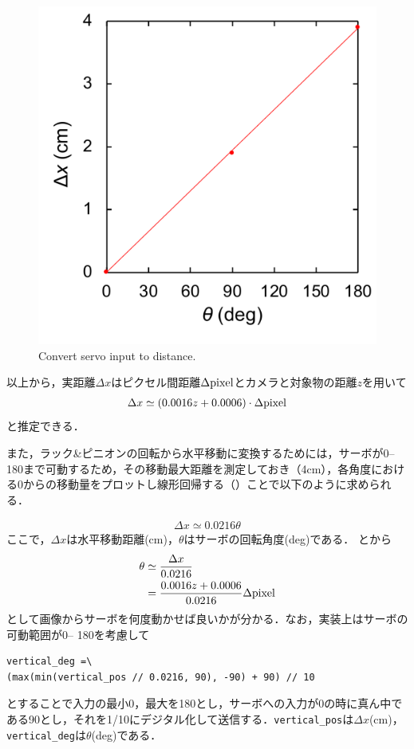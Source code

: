 \begin{figure}
    \centering
    \includegraphics[width=0.5\linewidth]{figure/chapter4/servo2distance}
    \caption{Convert servo input to distance.}
    \label{fig:servo2dist}
\end{figure}

以上から，実距離$\Delta x$はピクセル間距離$\Delta \rm{pixel}$とカメラと対象物の距離$z$を用いて
\begin{align}\label{eq:ピクセル間距離}
\Delta x \simeq (0.0016z + 0.0006) \cdot \Delta \rm{pixel}
\end{align}
と推定できる．

また，ラック\&ピニオンの回転から水平移動に変換するためには，サーボが0\deg -- 180\deg まで可動するため，その移動最大距離を測定しておき（4cm），各角度における0\deg からの移動量をプロットし線形回帰する（）ことで以下のように求められる．

\begin{align}\label{eq:スライド角度}
\Delta x \simeq 0.0216 \theta
\end{align}
ここで，$\Delta x$は水平移動距離(cm)，$\theta$はサーボの回転角度(deg)である．
とから
\begin{align}
\theta & \simeq \dfrac{\Delta x}{0.0216} \\
& = \dfrac{0.0016z + 0.0006}{0.0216} \Delta \rm{pixel} \\
\end{align}
として画像からサーボを何度動かせば良いかが分かる．なお，実装上はサーボの可動範囲が0\deg -- 180\deg を考慮して
\begin{lstlisting}[label=code:servo]
vertical_deg =\
(max(min(vertical_pos // 0.0216, 90), -90) + 90) // 10
\end{lstlisting}
とすることで入力の最小0，最大を180とし，サーボへの入力が0の時に真ん中である90\deg とし，それを1/10にデジタル化して送信する．\texttt{vertical\_pos}は$\Delta x$(cm)，\texttt{vertical\_deg}は$\theta$(deg)である．


